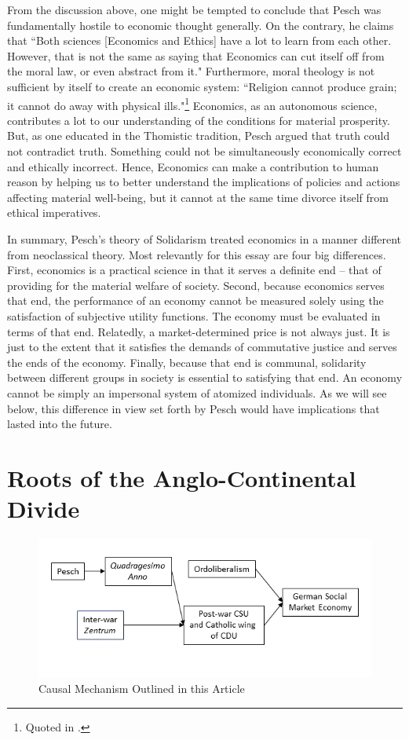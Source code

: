 \documentclass{article}
\begin{document}
From the discussion above, one might be tempted to conclude that Pesch was fundamentally hostile to economic thought generally.  On the contrary, he claims that ``Both sciences [Economics and Ethics] have a lot to learn from each other.  However, that is not the same as saying that Economics can cut itself off from the moral law, or even abstract from it." \citep[chap. 10]{pesch2004}  Furthermore, moral theology is not sufficient by itself to create an economic system:  ``Religion cannot produce grain; it cannot do away with physical ills."\footnote{Quoted in \citet[p. 151]{mueller1951}.}  Economics, as an autonomous science, contributes a lot to our understanding of the conditions for material prosperity.  But, as one educated in the Thomistic tradition, Pesch argued that truth could not contradict truth.  Something could not be simultaneously economically correct and ethically incorrect.  Hence, Economics can make a contribution to human reason by helping us to better understand the implications of policies and actions affecting material well-being, but it cannot at the same time divorce itself from ethical imperatives.\medskip

In summary, Pesch’s theory of Solidarism treated economics in a manner different from neoclassical theory.  Most relevantly for this essay are four big differences.  First, economics is a practical science in that it serves a definite end – that of providing for the material welfare of society.  Second, because economics serves that end, the performance of an economy cannot be measured solely using the satisfaction of subjective utility functions.  The economy must be evaluated in terms of that end.  Relatedly, a market-determined price is not always just.  It is just to the extent that it satisfies the demands of commutative justice and serves the ends of the economy.  Finally, because that end is communal, solidarity between different groups in society is essential to satisfying that end.  An economy cannot be simply an impersonal system of atomized individuals.  As we will see below, this difference in view set forth by Pesch would have implications that lasted into the future.

\section{Roots of the Anglo-Continental Divide}

\begin{figure}
    \centering
    \includegraphics{Figure1.png}
    \caption{Causal Mechanism Outlined in this Article}
    \label{fig:causalmechanism}
\end{figure}
\end{document}
